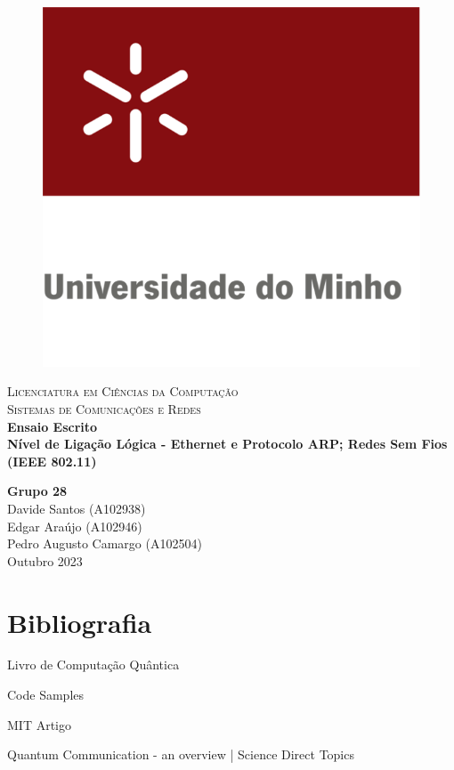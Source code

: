 \documentclass[12pt]{article}
\begin{document}
\begin{titlepage}

\center %

\newcommand{\HRule}{\rule{\linewidth}{0.4mm}} %

\begin{figure}[h]
    \centering
    \includegraphics[width=0.24\linewidth]{uniMinho.jpg}
\end{figure}

\textsc{\Large Licenciatura em Ciências da Computação}\\[0.4cm] %
\textsc{\Large Sistemas de Comunicações e Redes}\\[5cm]

{\Large\bfseries Ensaio Escrito}\\[0.5cm]
{\LARGE \bfseries   Nível de Ligação Lógica - Ethernet e Protocolo ARP; Redes Sem Fios (IEEE 802.11)} %


\vspace{5cm} %
{\bfseries Grupo 28} \\ \vspace{3mm}
Davide Santos (A102938) \\ \vspace{3mm}
Edgar Araújo (A102946) \\ \vspace{3mm}
Pedro Augusto Camargo (A102504) \\ \vspace{3mm}
\vspace{0.2cm}
{Outubro 2023}\\[0.2cm] %

\vfill %
\end{titlepage}


\tableofcontents







\section{Bibliografia}

Livro de Computação Quântica ~\cite{johnston2019programming}

Code Samples ~\cite{examplewebsite}

MIT Artigo ~\cite{examplewebsite2}

Quantum Communication - an overview | Science Direct Topics ~\cite{examplewebsite3}




\end{document}
